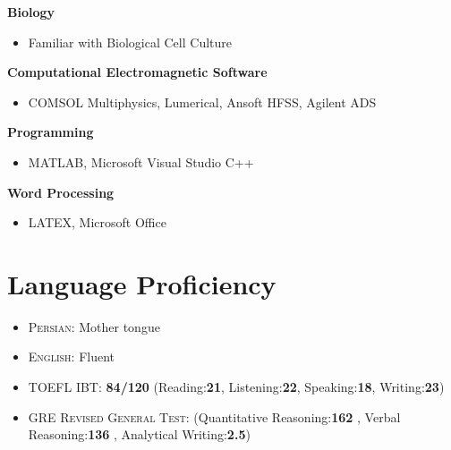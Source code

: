 \documentclass[a4paper,10pt]{article} %
\begin{document}
\begin{itemize}
\begin{itemize}
\begin{multicols}{2}
	\item
	{\bf Biology }
	\begin{itemize}
		\item
		Familiar with Biological Cell Culture
	\end{itemize}
	\vfill
	\columnbreak
			\item
			{\bf Computational Electromagnetic Software}
					\begin{itemize}
					\item
					COMSOL Multiphysics, Lumerical, Ansoft HFSS, Agilent ADS
					\end{itemize}
					\item
					{\bf Programming}
					\begin{itemize}
						\item MATLAB, Microsoft Visual Studio C++
					\end{itemize}
						
						\item
						{\bf Word Processing}
						\begin{itemize}
							\item
							LATEX, Microsoft Office
						\end{itemize}
			\end{multicols}
	
		
	\end{itemize}
	\vspace{2cm}
		\color{blue}
\section{Language Proficiency}
		\color{Black}
					\begin{multicols}{2}
						\begin{itemize}
			\item
				\textsc{Persian:}  Mother tongue
				
			\item
			\textsc{English:} Fluent 
			\end{itemize}
		 	\end{multicols}
					\begin{itemize}
							\item
			\textsc{TOEFL IBT}: {\bf84/120} (Reading:{\bf21}, Listening:{\bf22}, Speaking:{\bf18}, Writing:{\bf23})
				\item
		
			\textsc{GRE Revised General Test}: (Quantitative Reasoning:{\bf162} ,	Verbal Reasoning:{\bf136} , Analytical Writing:{\bf2.5})
				

\end{itemize}
\end{itemize}
\end{document}
